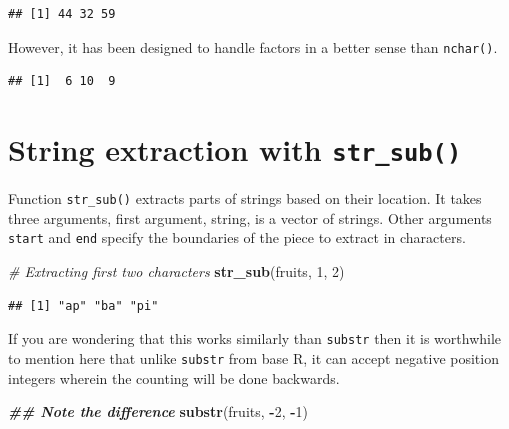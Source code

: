 \documentclass[
]{book}
\newenvironment{Shaded}{\begin{snugshade}}{\end{snugshade}}
\newcommand{\CommentTok}[1]{\textcolor[rgb]{0.56,0.35,0.01}{\textit{#1}}}
\newcommand{\DecValTok}[1]{\textcolor[rgb]{0.00,0.00,0.81}{#1}}
\newcommand{\DocumentationTok}[1]{\textcolor[rgb]{0.56,0.35,0.01}{\textbf{\textit{#1}}}}
\newcommand{\FunctionTok}[1]{\textcolor[rgb]{0.13,0.29,0.53}{\textbf{#1}}}
\newcommand{\NormalTok}[1]{#1}
\newcommand{\SpecialCharTok}[1]{\textcolor[rgb]{0.81,0.36,0.00}{\textbf{#1}}}
\begin{document}
\begin{verbatim}
## [1] 44 32 59
\end{verbatim}

However, it has been designed to handle factors in a better sense than \texttt{nchar()}.

\begin{Shaded}
\end{Shaded}

\begin{verbatim}
## [1]  6 10  9
\end{verbatim}

\hypertarget{string-extraction-with-str_sub}{%
\section{\texorpdfstring{String extraction with \texttt{str\_sub()}}{String extraction with str\_sub()}}\label{string-extraction-with-str_sub}}

Function \texttt{str\_sub()} extracts parts of strings based on their location. It takes three arguments, first argument, string, is a vector of strings. Other arguments \texttt{start} and \texttt{end} specify the boundaries of the piece to extract in characters.

\begin{Shaded}
\begin{Highlighting}[]
\CommentTok{\# Extracting first two characters}
\FunctionTok{str\_sub}\NormalTok{(fruits, }\DecValTok{1}\NormalTok{, }\DecValTok{2}\NormalTok{)}
\end{Highlighting}
\end{Shaded}

\begin{verbatim}
## [1] "ap" "ba" "pi"
\end{verbatim}

If you are wondering that this works similarly than \texttt{substr} then it is worthwhile to mention here that unlike \texttt{substr} from base R, it can accept negative position integers wherein the counting will be done backwards.

\begin{Shaded}
\begin{Highlighting}[]
\DocumentationTok{\#\# Note the difference}
\FunctionTok{substr}\NormalTok{(fruits, }\SpecialCharTok{{-}}\DecValTok{2}\NormalTok{, }\SpecialCharTok{{-}}\DecValTok{1}\NormalTok{)}
\end{Highlighting}
\end{Shaded}
\end{document}
